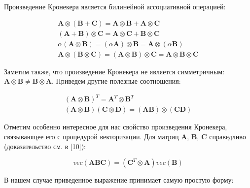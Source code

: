 Произведение Кронекера является билинейной ассоциативной операцией:

\begin{gather}
     \mathbf{A} \otimes (\mathbf{B} + \mathbf{C}) = \mathbf{A} \otimes \mathbf{B} + \mathbf{A} \otimes \mathbf{C} \\
    (\mathbf{A} + \mathbf{B}) \otimes \mathbf{C} = \mathbf{A} \otimes \mathbf{C} + \mathbf{B} \otimes \mathbf{C} \\
    \alpha(\mathbf{A} \otimes \mathbf{B}) = (\alpha\mathbf{A}) \otimes \mathbf{B} = \mathbf{A} \otimes (\alpha\mathbf{B}) \\
    \mathbf{A} \otimes(\mathbf{B} \otimes \mathbf{C}) =
   (\mathbf{A} \otimes \mathbf{B})\otimes \mathbf{C} =
    \mathbf{A} \otimes \mathbf{B} \otimes \mathbf{C}
\end{gather}

Заметим также, что произведение Кронекера не является симметричным: $\mathbf{A} \otimes \mathbf{B} \neq \mathbf{B} \otimes \mathbf{A}$.
Приведем другие полезные соотношения:

\begin{gather}
    (\mathbf{A} \otimes \mathbf{B})^T = \mathbf{A}^T \otimes \mathbf{B}^T \\
    (\mathbf{A} \otimes \mathbf{B}) (\mathbf{C} \otimes \mathbf{D}) = (\mathbf{A} \mathbf{B}) \otimes (\mathbf{C} \mathbf{D})
\end{gather}

Отметим особенно интересное для нас свойство произведения Кронекера, связывающее его с процедурой векторизации.
Для матриц $\mathbf{A}$, $\mathbf{B}$, $\mathbf{C}$ справедливо (доказательство см. в [10]):

\begin{equation}
    vec(\mathbf{A} \mathbf{B} \mathbf{C}) = (\mathbf{C}^T \otimes \mathbf{A}) vec(\mathbf{B})
    \label{eq:kron_vec}
\end{equation}

В нашем случае приведенное выражение принимает самую простую форму:

